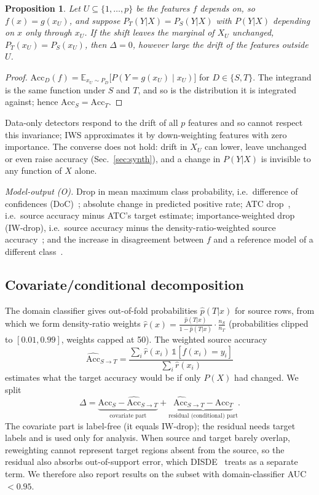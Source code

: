 \documentclass[conference]{IEEEtran}
\theoremstyle{plainhead}
\newtheorem{proposition}{Proposition}
\newcommand{\iws}{\textsc{IWS}}
\begin{document}
\begin{proposition}
Let $U\subseteq\{1,\dots,p\}$ be the features $f$ depends on, so $f(x)=g(x_U)$, and suppose $P_T(Y|X)=P_S(Y|X)$ with $P(Y|X)$ depending on $x$ only through $x_U$. If the shift leaves the marginal of $X_U$ unchanged, $P_T(x_U)=P_S(x_U)$, then $\Delta=0$, however large the drift of the features outside $U$.
\end{proposition}
\begin{proof}
$\mathrm{Acc}_D(f)=\mathbb{E}_{x_U\sim P_D}\big[P(Y{=}g(x_U)\mid x_U)\big]$ for $D\in\{S,T\}$. The integrand is the same function under $S$ and $T$, and so is the distribution it is integrated against; hence $\mathrm{Acc}_S=\mathrm{Acc}_T$.
\end{proof}

Data-only detectors respond to the drift of all $p$ features and so cannot respect this invariance; \iws{} approximates it by down-weighting features with zero importance. The converse does not hold: drift in $X_U$ can lower, leave unchanged or even raise accuracy (Sec.~\ref{sec:synth}), and a change in $P(Y|X)$ is invisible to any function of $X$ alone.

\textit{Model-output (O).} Drop in mean maximum class probability, i.e.\ difference of confidences (DoC)~\cite{guillory2021doc}; absolute change in predicted positive rate; ATC drop~\cite{garg2022atc}, i.e.\ source accuracy minus ATC's target estimate; importance-weighted drop (IW-drop), i.e.\ source accuracy minus the density-ratio-weighted source accuracy~\cite{shimodaira2000improving,sugiyama2007covariate}; and the increase in disagreement between $f$ and a reference model of a different class~\cite{baek2022agreement}.

\subsection{Covariate/conditional decomposition}
\label{sec:decomp}
The domain classifier gives out-of-fold probabilities $\hat p(T|x)$ for source rows, from which we form density-ratio weights $\hat r(x)=\frac{\hat p(T|x)}{1-\hat p(T|x)}\cdot\frac{n_S}{n_T}$ (probabilities clipped to $[0.01,0.99]$, weights capped at 50). The weighted source accuracy
\begin{equation}
\widehat{\mathrm{Acc}}_{S\to T}=\frac{\sum_i \hat r(x_i)\,\mathbb{1}[f(x_i)=y_i]}{\sum_i \hat r(x_i)}
\end{equation}
estimates what the target accuracy would be if only $P(X)$ had changed. We split
\begin{equation}
\Delta=\underbrace{\mathrm{Acc}_S-\widehat{\mathrm{Acc}}_{S\to T}}_{\text{covariate part}}
+\underbrace{\widehat{\mathrm{Acc}}_{S\to T}-\mathrm{Acc}_T}_{\text{residual (conditional) part}} .
\label{eq:decomp}
\end{equation}
The covariate part is label-free (it equals IW-drop); the residual needs target labels and is used only for analysis. When source and target barely overlap, reweighting cannot represent target regions absent from the source, so the residual also absorbs out-of-support error, which DISDE~\cite{cai2023diagnosing} treats as a separate term. We therefore also report results on the subset with domain-classifier AUC $<0.95$.
\end{document}
